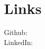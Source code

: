 
\section{Links} 
Github: \href{https://github.com/shan18}{} \\
LinkedIn: \href{https://www.linkedin.com/in/shantanu-acharya-b3053158/}{}
\sectionsep